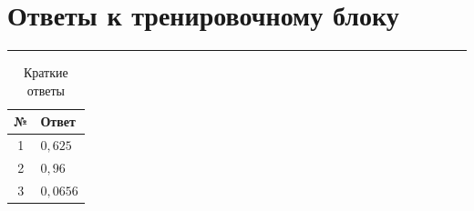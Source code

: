 \documentclass[a4paper,12pt]{article}
\newcommand{\sectionrule}{\vspace{-0.4em}\textcolor{accent}{\rule{\linewidth}{0.7pt}}\vspace{0.4em}}
\begin{document}
\newpage
\section*{Ответы к тренировочному блоку}
\sectionrule
\renewcommand{\arraystretch}{1.35}
\begin{table}[h!]
\centering
\caption{Краткие ответы}
\begin{tabularx}{\linewidth}{@{}cX@{}}
\toprule
\textbf{№} & \textbf{Ответ}\\
\midrule
1 & \(0{,}625\)\\
2 & \(0{,}96\)\\
3 & \(0{,}0656\)\\
\bottomrule
\end{tabularx}
\end{table}
\end{document}
